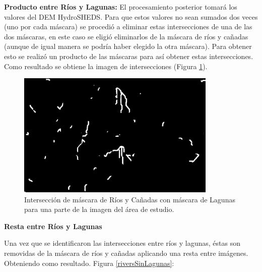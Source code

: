 \documentclass[10pt,a4paper, twoside]{report}
\begin{document}
\textbf{Producto entre Ríos y Lagunas:} El procesamiento posterior tomará los valores del DEM HydroSHEDS. Para que estos valores no sean sumados dos veces (uno por cada máscara) se procedió a eliminar estas intersecciones de una de las dos máscaras, en este caso se eligió eliminarlos de la máscara de ríos y cañadas (aunque de igual manera se podría haber elegido la otra máscara). Para obtener esto se realizó un producto de las máscaras para así obtener estas intersecciones. Como resultado se obtiene la imagen de intersecciones (Figura \ref{interseccionLagunasCañadas}).

\begin{figure}[H]
   \centering      
   \includegraphics[width=0.85\textwidth]{imagenes/interseccionLagunasCanadas.jpg}
 \caption{Intersección de máscara de Ríos y Cañadas con máscara de Lagunas para una parte de la imagen del área de estudio.}
 \label{interseccionLagunasCañadas}
\end{figure}



\textbf{Resta entre Ríos y Lagunas}
\label{restarioscaniadas}

Una vez que se identificaron las intersecciones entre ríos y lagunas, éstas son removidas de la máscara de ríos y cañadas aplicando una resta entre imágenes. Obteniendo como resultado. Figura \ref{riversSinLagunas}:
\end{document}
